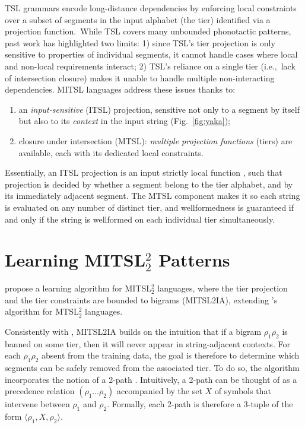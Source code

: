 \documentclass[11pt]{article}
\begin{document}
TSL grammars encode long-distance dependencies by enforcing local constraints over a subset of segments in the input alphabet (the tier) identified via a projection function.\
While TSL covers many unbounded phonotactic patterns, past work has highlighted two limits: 1) since TSL's tier projection is only sensitive to properties of individual segments, it cannot handle cases where local and non-local requirements interact; 2) TSL's  reliance on a single tier (i.e.,\ lack of intersection closure) makes it unable to handle multiple non-interacting dependencies.\@
MITSL languages \citep{de2019structure} address these issues thanks to:\
\begin{enumerate}
\item an \emph{input-sensitive} (ITSL) projection, sensitive not only to a segment by itself but also to its \emph{context} in the input string (Fig.\ \ref{fig:yaka}); 
\item closure under intersection (MTSL): \emph{multiple projection functions} (tiers) are available, each with its dedicated local constraints.
\end{enumerate}


Essentially, an ITSL projection is an input strictly local function \cite{ChandleeHeinz18}, such that projection is decided by whether a segment belong to the tier alphabet, and by its immediately adjacent segment.
The MTSL component makes it so each string is evaluated on any number of distinct tier, and wellformedness is guaranteed if and only if the string is wellformed on each individual tier simultaneously.
       
 \section{Learning MITSL$^2_2$ Patterns}
\citet{de2021learning} propose a learning algorithm for MITSL$^2_2$ languages, where the tier projection and the tier constraints are bounded to bigrams (MITSL2IA),  extending \citet{McMullinSCIL2019}'s algorithm for MTSL$^2_2$ languages.\@ 

Consistently with \citep{McMullinSCIL2019}, MITSL2IA builds on the intuition that  if a bigram $\rho_1\rho_2$ is banned on some tier, then it will never appear in string-adjacent contexts. 
For each $\rho_1\rho_2$ absent from the training data, the goal is therefore to determine which segments
can be safely removed from the associated tier. To do so, the algorithm incorporates the
notion of a 2-path \citep{JardineHeinz16}.
 Intuitively, a 2-path can be thought of as a
precedence relation $(\rho_1 \dots \rho_2 )$ accompanied by the set $X$ of symbols that intervene between $\rho_1$ and $\rho_2$.
 Formally, each 2-path is therefore a 3-tuple of the form $\langle \rho_1, X, \rho_2 \rangle$. 
\end{document}
